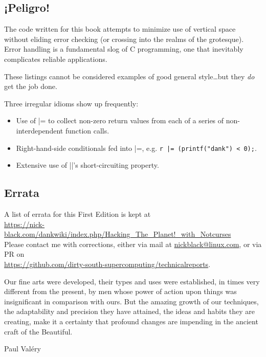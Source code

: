 \documentclass[letterpaper,10pt]{article}
\newenvironment{denseitemize}{
  \begin{itemize}
      \setlength{\itemsep}{0pt}
}{
  \end{itemize}
}
\begin{document}
\subsection*{¡Peligro!}

The code written for this book attempts to minimize use of vertical space
without eliding error checking (or crossing into the realms of the grotesque).
Error handling is a fundamental slog of C programming, one that
inevitably complicates reliable applications.

These listings cannot be considered examples of good general style\ldots but they \textit{do} get the job done.

Three irregular idioms show up frequently:

\begin{denseitemize}
\item{Use of |= to collect non-zero return values from each of a series of
      non-interdependent function calls.}
\item{Right-hand-side conditionals fed into |=, e.g. \texttt{r |= (printf("dank") < 0);}.}
\item{Extensive use of ||'s short-circuiting property.}
\end{denseitemize}

\subsection*{Errata}
A list of errata for this First Edition is kept at\\

\url{https://nick-black.com/dankwiki/index.php/Hacking\_The\_Planet!\_with\_Notcurses}\\

Please contact me with corrections, either via mail at \href{mailto:nickblack@linux.com}{nickblack@linux.com},
or via PR on\\

\url{https://github.com/dirty-south-supercomputing/technicalreports}.

\clearpage

\epigraph{Our fine arts were developed, their types and uses were established, in times
very different from the present, by men whose power of action upon things was
insignificant in comparison with ours. But the amazing growth of our
techniques, the adaptability and precision they have attained, the ideas and
habits they are creating, make it a certainty that profound changes are
impending in the ancient craft of the Beautiful.}{Paul Valéry}
\end{document}

